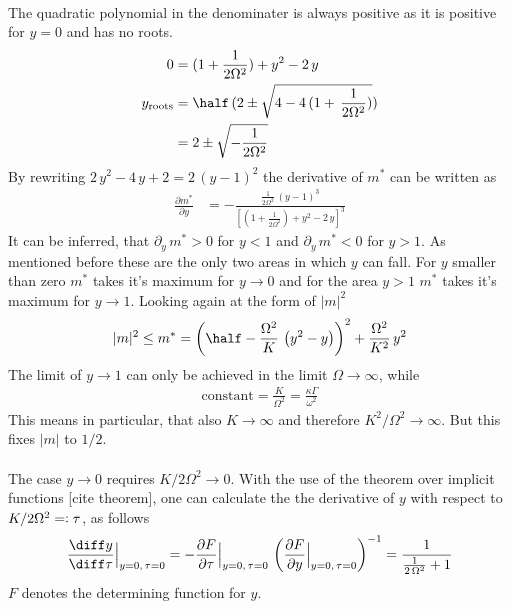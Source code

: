 \begin{appendices}
\begin{align*}
    \end{align*}
    The quadratic polynomial in the denominater is always positive as it is positive for $y=0$ and has no roots.
    \begin{align*}
        0&=(1+\frac{1}{2\Omega^2})+{y}^2-2\,{y}\\
        y_\text{roots}&=\half\,(2\pm\sqrt{4-4\,(1+\,\frac{1}{2\Omega^2})})\\
        &=2\pm\sqrt{-\frac{1}{2\Omega^2}}
    \end{align*}
    By rewriting $2\,y^2-4\,y+2=2\,(y-1)^2$ the derivative of $m^*$ can be written as
    \begin{align*}
        \frac{\partial m^*}{\partial{y}}&=-\frac{\frac{1}{2\Omega^2}\,({y}-1)^3}{\left[(1+\frac{1}{2\Omega^2})+{y}^2-2\,{y}\right]^3}
    \end{align*}
    It can be inferred, that $\partial_{{y}}\,m^*>0$ for ${y}<1$ and $\partial_{{y}}\,m^*<0$ for ${y}>1$. As mentioned before these are the only two areas in which ${y}$ can fall. For $y$ smaller than zero $m^*$ takes it's maximum for ${y}\rightarrow0$ and for the area ${y}>1$ $m^*$ takes it's maximum for ${y}\rightarrow1$. Looking again at the form of $|m|^2$ 
    \begin{align*}
        |m|^2\leq m^*=\left( \half-\frac{\Omega^2}{K}\,\left( {y}^2- {y} \right) \right)^2+\frac{\Omega^2}{K^2}\,{y}^2
    \end{align*}
    The limit of ${y}\rightarrow1$ can only be achieved in the limit $\Omega\rightarrow\infty$, while%
    \begin{align*}
        \text{constant}=\frac{K}{\Omega^2}=\frac{\kappa\Gamma}{\omega^2}
    \end{align*}
    This means in particular, that also $K\rightarrow\infty$ and therefore $K^2/\Omega^2\rightarrow\infty$. But this fixes $|m|$ to $1/2$. \\\\
    The case $y\rightarrow0$ requires $K/2\Omega^2\rightarrow0$. With the use of the theorem over implicit functions [cite theorem], one can calculate the the derivative of $y$ with respect to $K/2\Omega^2=\vcentcolon\tau$, as follows
    \begin{align*}
        \frac{\diff y}{\diff\tau}\Big|_{y=0,\,\tau=0}=-\frac{\partial F}{\partial\tau}\Big|_{y=0,\,\tau=0}\,\left(\frac{\partial F}{\partial y}\Big|_{y=0,\,\tau=0}\right)^{-1}=\frac{1}{\frac{1}{2\,\Omega^2}+1}
    \end{align*}
    $F$ denotes the determining function for $y$. 

\end{appendices}
